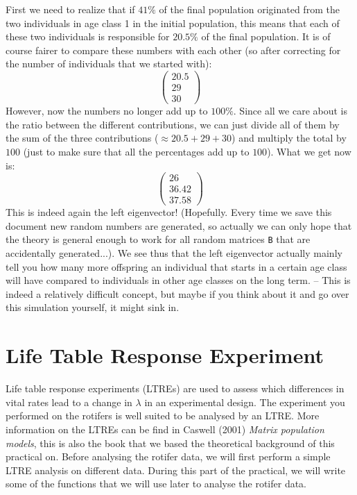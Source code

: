 \documentclass{article}\usepackage[]{graphicx}\usepackage[]{color}
\begin{document}
\begin{mdframed}
First we need to realize that if $41\% $ of the final population originated from the two individuals in age class 1 in the initial population, this means that each of these two individuals is responsible for $20.5\% $ of the final population. It is of course fairer to compare these numbers with each other (so after correcting for the number of individuals that we started with):
\begin{equation*}
\begin{pmatrix}
20.5 \\
29 \\
30
\end{pmatrix}
\end{equation*}
However, now the numbers no longer add up to $100\%$. Since all we care about is the ratio between the different contributions, we can just divide all of them by the sum of the three contributions ($\approx 20.5 +29 + 30 $) and multiply the total by $100$ (just to make sure that all the percentages add up to $100$). What we get now is: 
\begin{equation*}
\begin{pmatrix}
26 \\
36.42 \\
37.58
\end{pmatrix}
\end{equation*}
This is indeed again the left eigenvector! (Hopefully. Every time we save this document new random numbers are generated, so actually we can only hope that the theory is general enough to work for all random matrices \texttt{B} that are accidentally generated...). We see thus that the left eigenvector actually mainly tell you how many more offspring an individual that starts in a certain age class will have compared to individuals in other age classes on the long term. -- This is indeed a relatively difficult concept, but maybe if you think about it and go over this simulation yourself, it might sink in.
\end{mdframed}

\section{Life Table Response Experiment}
Life table response experiments (LTREs) are used to assess which  differences in vital rates lead to a change in $\lambda$ in an experimental design. The experiment you performed on the rotifers is well suited to be analysed by an LTRE. More information on the LTREs can be find in Caswell (2001) \textit{Matrix population models}, this is also the book that we based the theoretical background of this practical on. Before analysing the rotifer data, we will first perform a simple LTRE analysis on different data. During this part of the practical, we will write some of the functions that we will use later to analyse the rotifer data.
\end{document}
